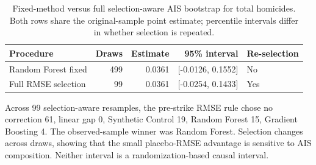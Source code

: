 \begin{table}[htbp]
\centering\small
\caption{Fixed-method versus full selection-aware AIS bootstrap for total homicides. Both rows share the original-sample point estimate; percentile intervals differ in whether selection is repeated.}
\label{tab:selectionrebuild}
\begin{tabular}{lrrrl}
\toprule
Procedure & Draws & Estimate & 95\% interval & Re-selection\\
\midrule
Random Forest fixed & 499 & 0.0361 & [-0.0126, 0.1552] & No\\
Full RMSE selection & 99 & 0.0361 & [-0.0254, 0.1433] & Yes\\
\bottomrule
\end{tabular}
\end{table}

Across 99 selection-aware resamples, the pre-strike RMSE rule chose no correction 61, linear gap 0, Synthetic Control 19, Random Forest 15, Gradient Boosting 4. The observed-sample winner was Random Forest. Selection changes across draws, showing that the small placebo-RMSE advantage is sensitive to AIS composition. Neither interval is a randomization-based causal interval.
